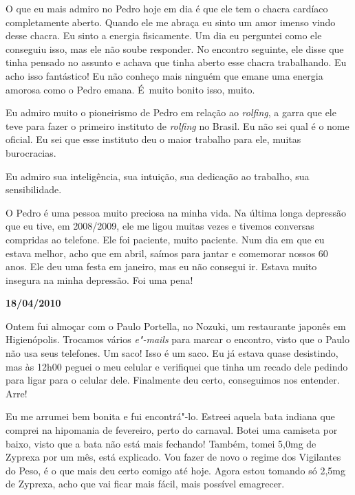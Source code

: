 O que eu mais admiro no Pedro hoje em dia é que ele tem o chacra
cardíaco completamente aberto. Quando ele me abraça eu sinto um amor
imenso vindo desse chacra. Eu sinto a energia fisicamente. Um dia eu
perguntei como ele conseguiu isso, mas ele não soube responder. No
encontro seguinte, ele disse que tinha pensado no assunto e achava que
tinha aberto esse chacra trabalhando. Eu acho isso fantástico! Eu não
conheço mais ninguém que emane uma energia amorosa como o Pedro emana. É~muito bonito isso, muito.

Eu admiro muito o pioneirismo de Pedro em relação ao \emph{rolfing}, a
garra que ele teve para fazer o primeiro instituto de \emph{rolfing} no
Brasil. Eu não sei qual é o nome oficial. Eu sei que esse instituto deu
o maior trabalho para ele, muitas burocracias.

Eu admiro sua inteligência, sua intuição, sua dedicação ao trabalho, sua
sensibilidade.

O Pedro é uma pessoa muito preciosa na minha vida. Na última longa
depressão que eu tive, em 2008/2009, ele me ligou muitas vezes e tivemos
conversas compridas ao telefone. Ele foi paciente, muito paciente. Num
dia em que eu estava melhor, acho que em abril, saímos para jantar e
comemorar nossos 60 anos. Ele deu uma festa em janeiro, mas eu não
consegui ir. Estava muito insegura na minha depressão. Foi uma pena!

\begin{center}\textbf{\asterisc{}}\end{center}

\begin{flushright}\textbf{18/04/2010}\end{flushright}


Ontem fui almoçar com o Paulo Portella, no Nozuki, um restaurante
japonês em Higienópolis. Trocamos vários \emph{e"-mails} para marcar o
encontro, visto que o Paulo não usa seus telefones. Um saco! Isso é um
saco. Eu já estava quase desistindo, mas às 12h00 peguei o meu celular e
verifiquei que tinha um recado dele pedindo para ligar para o celular
dele. Finalmente deu certo, conseguimos nos entender. Arre!

Eu me arrumei bem bonita e fui encontrá"-lo. Estreei aquela bata indiana
que comprei na hipomania de fevereiro, perto do carnaval. Botei uma
camiseta por baixo, visto que a bata não está mais fechando!
Também, tomei 5,0mg de Zyprexa por um mês, está explicado. Vou fazer de
novo o regime dos Vigilantes do Peso, é o que mais deu certo comigo até
hoje. Agora estou tomando só 2,5mg de Zyprexa, acho que vai ficar mais
fácil, mais possível emagrecer.

